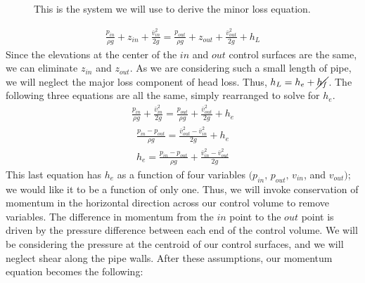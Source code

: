 \documentclass[letterpaper,10pt,english]{sphinxmanual}
\let\sphinxpxdimen\pdfpxdimen\else\newdimen\sphinxpxdimen
\begin{document}
\begin{figure}[htbp]
\centering
\capstart

\noindent\sphinxincludegraphics[width=700\sphinxpxdimen]{{minor_loss_pipe}.png}
\caption{This is the system we will use to derive the minor loss equation.}\label{\detokenize{Fluids_Review/Fluids_Review_Derivations:id2}}\label{\detokenize{Fluids_Review/Fluids_Review_Derivations:minor-loss-pipe}}\end{figure}
\begin{equation}\label{equation:Fluids_Review/Fluids_Review_Derivations:Fluids_Review/Fluids_Review_Derivations:0}
\begin{split}\frac{p_{in}}{\rho g} + {z_{in}} + \frac{\bar v_{in}^2}{2g} = \frac{p_{out}}{\rho g} + z_{out} + \frac{\bar v_{out}^2}{2g} + h_L\end{split}
\end{equation}
Since the elevations at the center of the \(in\) and \(out\) control surfaces are the same, we can eliminate \(z_{in}\) and \(z_{out}\). As we are considering such a small length of pipe, we will neglect the major loss component of head loss. Thus, \(h_L = h_e + \cancel{h_f}\). The following three equations are all the same, simply rearranged to solve for \(h_e\).
\begin{equation}\label{equation:Fluids_Review/Fluids_Review_Derivations:Fluids_Review/Fluids_Review_Derivations:1}
\begin{split}\frac{p_{in}}{\rho g} + \frac{\bar v_{in}^2}{2g} = \frac{p_{out}}{\rho g} + \frac{\bar v_{out}^2}{2g} + h_e\end{split}
\end{equation}\begin{equation}\label{equation:Fluids_Review/Fluids_Review_Derivations:Fluids_Review/Fluids_Review_Derivations:2}
\begin{split}\frac{p_{in} - p_{out}}{\rho g} = \frac{\bar v_{out}^2 - \bar v_{in}^2}{2g} + h_e\end{split}
\end{equation}\begin{equation}\label{equation:Fluids_Review/Fluids_Review_Derivations:minor_loss_energy_eq}
\begin{split}  h_e = \frac{p_{in} - p_{out}}{\rho g} + \frac{\bar v_{in}^2 - \bar v_{out}^2}{2g}\end{split}
\end{equation}
This last equation has \(h_e\) as a function of four variables \((p_{in}, \, p_{out}, \, v_{in}\), and \(v_{out})\); we would like it to be a function of only one. Thus, we will invoke conservation of momentum in the horizontal direction across our control volume to remove variables. The difference in momentum from the \(in\) point to the \(out\) point is driven by the pressure difference between each end of the control volume. We will be considering the pressure at the centroid of our control surfaces, and we will neglect shear along the pipe walls. After these assumptions, our momentum equation becomes the following:
\end{document}
